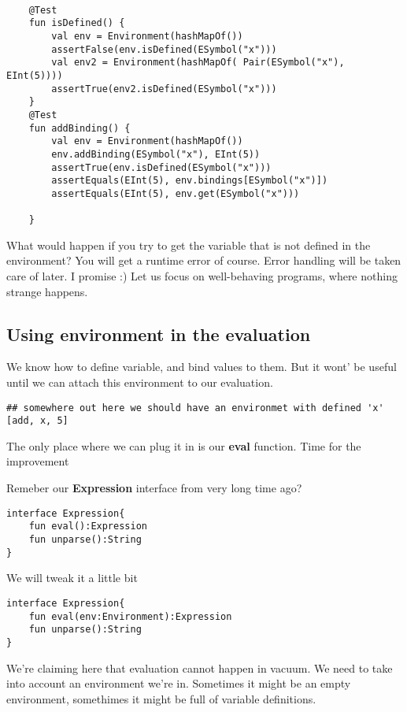 \documentclass[11pt]{article}
\begin{document}
\begin{verbatim}

    @Test
    fun isDefined() {
        val env = Environment(hashMapOf())
        assertFalse(env.isDefined(ESymbol("x")))
        val env2 = Environment(hashMapOf( Pair(ESymbol("x"), EInt(5))))
        assertTrue(env2.isDefined(ESymbol("x")))
    }
    @Test
    fun addBinding() {
        val env = Environment(hashMapOf())
        env.addBinding(ESymbol("x"), EInt(5))
        assertTrue(env.isDefined(ESymbol("x")))
        assertEquals(EInt(5), env.bindings[ESymbol("x")])
        assertEquals(EInt(5), env.get(ESymbol("x")))

    }
\end{verbatim}

What would happen if you try to get the variable that is not defined in the environment?
You will get a runtime error of course. Error handling will be taken care of later. I promise :)
Let us focus on well-behaving programs, where nothing strange happens.

\subsection{Using environment in the evaluation}
\label{sec:orgeabd8a0}
We know how to define variable, and bind values to them.
But it wont' be useful until we can attach this environment to our evaluation.
\begin{verbatim}
## somewhere out here we should have an environmet with defined 'x'
[add, x, 5]
\end{verbatim}

The only place where we can plug it in is our \textbf{eval} function.
Time for the improvement

Remeber our \textbf{Expression} interface from very long time ago?
\begin{verbatim}
interface Expression{
    fun eval():Expression
    fun unparse():String
}
\end{verbatim}

We will tweak it a little bit

\begin{verbatim}
interface Expression{
    fun eval(env:Environment):Expression
    fun unparse():String
}
\end{verbatim}

We're claiming here that evaluation cannot happen in vacuum. We need to take into account an environment we're in.
Sometimes it might be an empty environment, somethimes it might be full of variable definitions.
\end{document}
